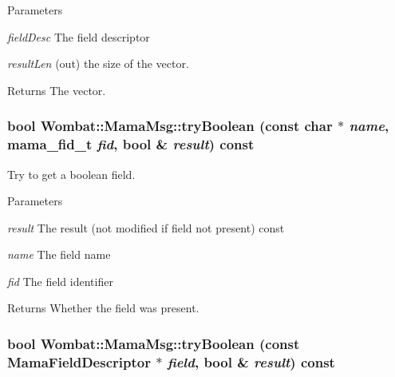 \begin{DoxyParams}{Parameters}
\item[{\em fieldDesc}]The field descriptor \item[{\em resultLen}](out) the size of the vector. \end{DoxyParams}
\begin{DoxyReturn}{Returns}
The vector. 
\end{DoxyReturn}
\hypertarget{classWombat_1_1MamaMsg_ac353caec908ec326e74dc1b5dcc4d5c4}{
\subsubsection[{tryBoolean}]{\setlength{\rightskip}{0pt plus 5cm}bool Wombat::MamaMsg::tryBoolean (const char $\ast$ {\em name}, \/  mama\_\-fid\_\-t {\em fid}, \/  bool \& {\em result}) const}}
\label{classWombat_1_1MamaMsg_ac353caec908ec326e74dc1b5dcc4d5c4}


Try to get a boolean field. 
\begin{DoxyParams}{Parameters}
\item[{\em result}]The result (not modified if field not present) const \item[{\em name}]The field name \item[{\em fid}]The field identifier \end{DoxyParams}
\begin{DoxyReturn}{Returns}
Whether the field was present. 
\end{DoxyReturn}
\hypertarget{classWombat_1_1MamaMsg_a99334c69175231c1d3016e3f2911476f}{
\subsubsection[{tryBoolean}]{\setlength{\rightskip}{0pt plus 5cm}bool Wombat::MamaMsg::tryBoolean (const {\bf MamaFieldDescriptor} $\ast$ {\em field}, \/  bool \& {\em result}) const}}
\label{classWombat_1_1MamaMsg_a99334c69175231c1d3016e3f2911476f}


